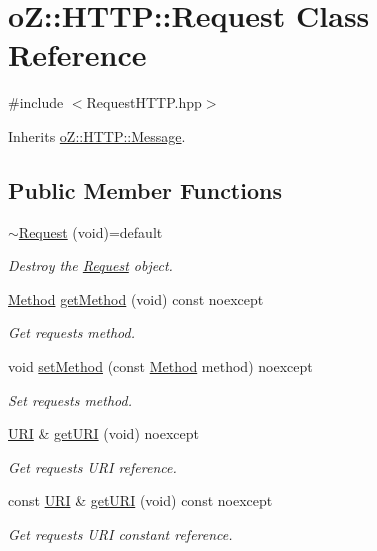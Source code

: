 \hypertarget{classo_z_1_1_h_t_t_p_1_1_request}{}\section{oZ\+::H\+T\+TP\+::Request Class Reference}
\label{classo_z_1_1_h_t_t_p_1_1_request}


{\ttfamily \#include $<$Request\+H\+T\+T\+P.\+hpp$>$}



Inherits \mbox{\hyperlink{classo_z_1_1_h_t_t_p_1_1_message}{o\+Z\+::\+H\+T\+T\+P\+::\+Message}}.

\subsection*{Public Member Functions}
\begin{DoxyCompactItemize}
\item 
\mbox{\hyperlink{classo_z_1_1_h_t_t_p_1_1_request_a2bc2913d79ffe8ce63a19c480b9cf330}{$\sim$\+Request}} (void)=default
\begin{DoxyCompactList}\small\item\em Destroy the \mbox{\hyperlink{classo_z_1_1_h_t_t_p_1_1_request}{Request}} object. \end{DoxyCompactList}\item 
\mbox{\hyperlink{namespaceo_z_1_1_h_t_t_p_a02d8497e4abbb0adf3af0fe9fad1b7a6}{Method}} \mbox{\hyperlink{classo_z_1_1_h_t_t_p_1_1_request_ab8c06f60e7d3b17c2ad03c7b9cb046d7}{get\+Method}} (void) const noexcept
\begin{DoxyCompactList}\small\item\em Get request\textquotesingle{}s method. \end{DoxyCompactList}\item 
void \mbox{\hyperlink{classo_z_1_1_h_t_t_p_1_1_request_ad38f30d48f4d3f201380ac1e73b26fc8}{set\+Method}} (const \mbox{\hyperlink{namespaceo_z_1_1_h_t_t_p_a02d8497e4abbb0adf3af0fe9fad1b7a6}{Method}} method) noexcept
\begin{DoxyCompactList}\small\item\em Set request\textquotesingle{}s method. \end{DoxyCompactList}\item 
\mbox{\hyperlink{namespaceo_z_1_1_h_t_t_p_a6d47156e2eac27750983fc1b54bd2ff8}{U\+RI}} \& \mbox{\hyperlink{classo_z_1_1_h_t_t_p_1_1_request_aaec3f19cb4ee6a18878166049df3253a}{get\+U\+RI}} (void) noexcept
\begin{DoxyCompactList}\small\item\em Get request\textquotesingle{}s U\+RI reference. \end{DoxyCompactList}\item 
const \mbox{\hyperlink{namespaceo_z_1_1_h_t_t_p_a6d47156e2eac27750983fc1b54bd2ff8}{U\+RI}} \& \mbox{\hyperlink{classo_z_1_1_h_t_t_p_1_1_request_afe1db07c464e1b708187108cbef952fa}{get\+U\+RI}} (void) const noexcept
\begin{DoxyCompactList}\small\item\em Get request\textquotesingle{}s U\+RI constant reference. \end{DoxyCompactList}\end{DoxyCompactItemize}


